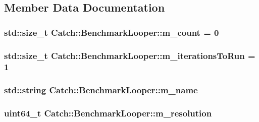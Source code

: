 \subsection{Member Data Documentation}
\hypertarget{class_catch_1_1_benchmark_looper_aae36ced9e5b1c884e2b3ac9d04c1c373}{
\subsubsection[{m\-\_\-count}]{\setlength{\rightskip}{0pt plus 5cm}std\-::size\-\_\-t Catch\-::\-Benchmark\-Looper\-::m\-\_\-count = 0\hspace{0.3cm}{\ttfamily [private]}}}\label{class_catch_1_1_benchmark_looper_aae36ced9e5b1c884e2b3ac9d04c1c373}
\hypertarget{class_catch_1_1_benchmark_looper_af28bef6706fe983afca85d2ccd2b6ca8}{
\subsubsection[{m\-\_\-iterations\-To\-Run}]{\setlength{\rightskip}{0pt plus 5cm}std\-::size\-\_\-t Catch\-::\-Benchmark\-Looper\-::m\-\_\-iterations\-To\-Run = 1\hspace{0.3cm}{\ttfamily [private]}}}\label{class_catch_1_1_benchmark_looper_af28bef6706fe983afca85d2ccd2b6ca8}
\hypertarget{class_catch_1_1_benchmark_looper_afa2005187a2abbcae69a5b16c89e68c3}{
\subsubsection[{m\-\_\-name}]{\setlength{\rightskip}{0pt plus 5cm}std\-::string Catch\-::\-Benchmark\-Looper\-::m\-\_\-name\hspace{0.3cm}{\ttfamily [private]}}}\label{class_catch_1_1_benchmark_looper_afa2005187a2abbcae69a5b16c89e68c3}
\hypertarget{class_catch_1_1_benchmark_looper_a7e7168e3d346e78d6e85c810aec6a55d}{
\subsubsection[{m\-\_\-resolution}]{\setlength{\rightskip}{0pt plus 5cm}uint64\-\_\-t Catch\-::\-Benchmark\-Looper\-::m\-\_\-resolution\hspace{0.3cm}{\ttfamily [private]}}}\label{class_catch_1_1_benchmark_looper_a7e7168e3d346e78d6e85c810aec6a55d}
